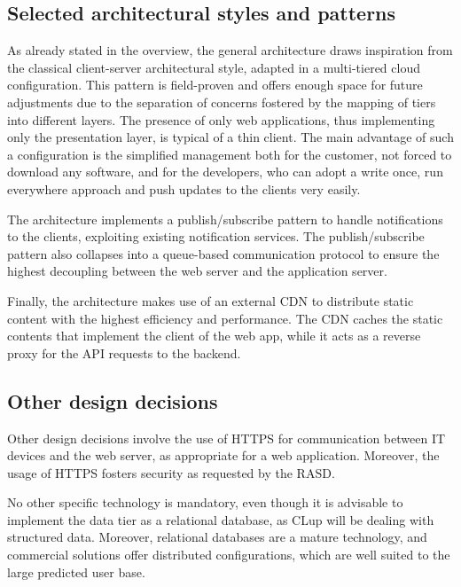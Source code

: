\documentclass[../../main.tex]{subfiles}
\begin{document}
\subsection{Selected architectural styles and patterns}


    As already stated in the overview, the general architecture draws inspiration from the classical client-server architectural style, adapted in a multi-tiered cloud configuration.  
    This pattern is field-proven and offers enough space for future adjustments due to the separation of concerns fostered by the mapping of tiers into different layers.
    The presence of only web applications, thus implementing only the presentation layer, is typical of a thin client. The main advantage of such a configuration is the simplified management both for the customer, not forced to download any software, and for the developers, who can adopt a write once, run everywhere approach and push updates to the clients very easily.

    The architecture implements a publish/subscribe pattern to handle notifications to the clients, exploiting existing notification services. 
    The publish/subscribe pattern also collapses into a queue-based communication protocol to ensure the highest decoupling between the web server and the application server.

    Finally, the architecture makes use of an external CDN to distribute static content with the highest efficiency and performance. The CDN caches the static contents that implement the client of the web app, while it acts as a reverse proxy for the API requests to the backend.

\subsection{Other design decisions}


    Other design decisions involve the use of HTTPS for communication between IT devices and the web server, as appropriate for a web application. 
    Moreover, the usage of HTTPS fosters security as requested by the RASD.

    No other specific technology is mandatory, even though it is advisable to implement the data tier as a relational database, 
    as CLup will be dealing with structured data. Moreover, relational databases are a mature technology, and commercial solutions offer distributed configurations, 
    which are well suited to the large predicted user base.
\end{document}
